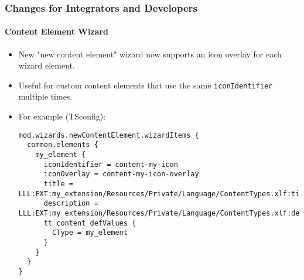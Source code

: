 %

\begin{frame}[fragile]
	\frametitle{Changes for Integrators and Developers}
	\framesubtitle{Content Element Wizard}


	\begin{itemize}
		\item New "new content element" wizard now supports an icon overlay for
			each wizard element.
		\item Useful for custom content elements that use the same
			\texttt{iconIdentifier} multiple times.
		\item For example (TSconfig):
\begin{lstlisting}
mod.wizards.newContentElement.wizardItems {
  common.elements {
    my_element {
      iconIdentifier = content-my-icon
      iconOverlay = content-my-icon-overlay
      title = LLL:EXT:my_extension/Resources/Private/Language/ContentTypes.xlf:title
      description = LLL:EXT:my_extension/Resources/Private/Language/ContentTypes.xlf:description
      tt_content_defValues {
        CType = my_element
      }
    }
  }
}
\end{lstlisting}

	\end{itemize}

\end{frame}

